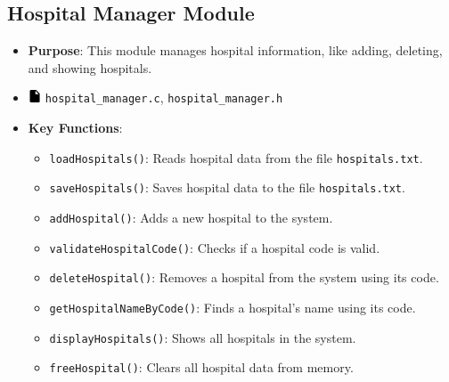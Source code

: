 \documentclass[12pt,a4paper]{report}
\begin{document}
\subsection{Hospital Manager Module}
\begin{itemize}
    \item \normalsize \textbf{Purpose}: This module manages hospital information, like adding, deleting, and showing hospitals.
    \item \normalsize \includegraphics[width=0.03\textwidth]{../resources/assets/images/file_icon.png} \texttt{hospital\_manager.c}, \texttt{hospital\_manager.h}
    \item \normalsize \textbf{Key Functions}:
    \begin{itemize}
        \item \texttt{loadHospitals()}: Reads hospital data from the file \texttt{hospitals.txt}.
        \item \texttt{saveHospitals()}: Saves hospital data to the file \texttt{hospitals.txt}.
        \item \texttt{addHospital()}: Adds a new hospital to the system.
        \item \texttt{validateHospitalCode()}: Checks if a hospital code is valid.
        \item \texttt{deleteHospital()}: Removes a hospital from the system using its code.
        \item \texttt{getHospitalNameByCode()}: Finds a hospital's name using its code.
        \item \texttt{displayHospitals()}: Shows all hospitals in the system.
        \item \texttt{freeHospital()}: Clears all hospital data from memory.
    \end{itemize}
\end{itemize}
\end{document}
